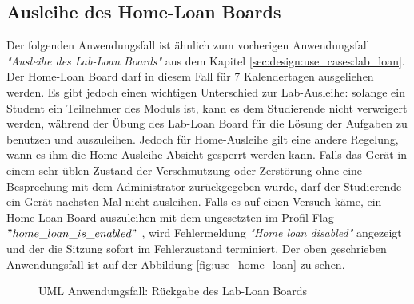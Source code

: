 \subsection{Ausleihe des Home-Loan Boards}
\label{sec:design:use_cases:home_loan}
Der folgenden Anwendungsfall ist ähnlich zum vorherigen Anwendungsfall \textit{"Ausleihe des Lab-Loan Boards"} aus dem Kapitel \ref{sec:design:use_cases:lab_loan}. Der Home-Loan Board darf in diesem Fall für 7 Kalendertagen ausgeliehen werden. Es gibt jedoch einen wichtigen Unterschied zur Lab-Ausleihe: solange ein Student ein Teilnehmer des Moduls ist, kann es dem Studierende nicht verweigert werden, während der Übung des Lab-Loan Board für die Lösung der Aufgaben zu benutzen und auszuleihen. Jedoch für Home-Ausleihe gilt eine andere Regelung, wann es ihm die Home-Ausleihe-Absicht gesperrt werden kann. Falls das Gerät in einem sehr üblen Zustand der Verschmutzung oder Zerstörung ohne eine Besprechung mit dem Administrator zurückgegeben wurde, darf der Studierende ein Gerät nachsten Mal nicht ausleihen. Falls es auf einen Versuch käme, ein Home-Loan Board auszuleihen mit dem ungesetzten im Profil Flag $"home\_loan\_is\_enabled"$ , wird Fehlermeldung \textit{"Home loan disabled"} angezeigt und der die Sitzung sofort im Fehlerzustand terminiert.  Der oben geschrieben Anwendungsfall ist auf der Abbildung \ref{fig:use_home_loan} zu sehen.

\begin{figure}
	\centering
	\caption{UML Anwendungsfall: Rückgabe des Lab-Loan Boards}
	\label{fig:use_lab_return}
\end{figure}


